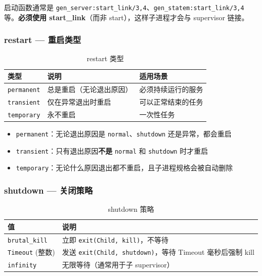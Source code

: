 \documentclass[a4paper,11pt]{article}
\begin{document}
\begin{warnbox}[重要]
启动函数通常是 \texttt{gen\_server:start\_link/3,4}、\texttt{gen\_statem:start\_link/3,4} 等。\textbf{必须使用 start\_link}（而非 start），这样子进程才会与 supervisor 链接。
\end{warnbox}

\subsubsection{restart --- 重启类型}

\begin{table}[H]
\centering
\begin{tabular}{@{}lll@{}}
\toprule
\textbf{类型} & \textbf{说明} & \textbf{适用场景} \\
\midrule
\texttt{permanent} & 总是重启（无论退出原因） & 必须持续运行的服务 \\
\texttt{transient} & 仅在异常退出时重启 & 可以正常结束的任务 \\
\texttt{temporary} & 永不重启 & 一次性任务 \\
\bottomrule
\end{tabular}
\caption{restart 类型}
\end{table}

\begin{tipbox}
\begin{itemize}[leftmargin=1.5em]
    \item \texttt{permanent}：无论退出原因是 \texttt{normal}、\texttt{shutdown} 还是异常，都会重启
    \item \texttt{transient}：只有退出原因\textbf{不是} \texttt{normal} 和 \texttt{shutdown} 时才重启
    \item \texttt{temporary}：无论什么原因退出都不重启，且子进程规格会被自动删除
\end{itemize}
\end{tipbox}

\subsubsection{shutdown --- 关闭策略}

\begin{table}[H]
\centering
\begin{tabular}{@{}ll@{}}
\toprule
\textbf{值} & \textbf{说明} \\
\midrule
\texttt{brutal\_kill} & 立即 \texttt{exit(Child, kill)}，不等待 \\
\texttt{Timeout} (整数) & 发送 \texttt{exit(Child, shutdown)}，等待 Timeout 毫秒后强制 kill \\
\texttt{infinity} & 无限等待（通常用于子 supervisor） \\
\bottomrule
\end{tabular}
\caption{shutdown 策略}
\end{table}
\end{document}
